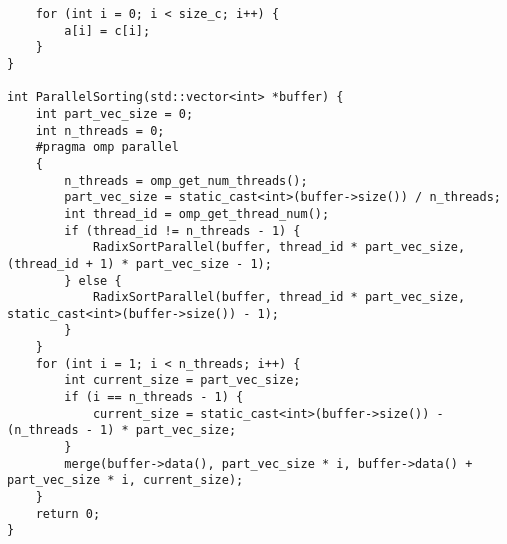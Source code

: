 \documentclass{report}
\begin{document}
\begin{lstlisting}
    for (int i = 0; i < size_c; i++) {
        a[i] = c[i];
    }
}

int ParallelSorting(std::vector<int> *buffer) {
    int part_vec_size = 0;
    int n_threads = 0;
    #pragma omp parallel
    {
        n_threads = omp_get_num_threads();
        part_vec_size = static_cast<int>(buffer->size()) / n_threads;
        int thread_id = omp_get_thread_num();
        if (thread_id != n_threads - 1) {
            RadixSortParallel(buffer, thread_id * part_vec_size, (thread_id + 1) * part_vec_size - 1);
        } else {
            RadixSortParallel(buffer, thread_id * part_vec_size, static_cast<int>(buffer->size()) - 1);
        }
    }
    for (int i = 1; i < n_threads; i++) {
        int current_size = part_vec_size;
        if (i == n_threads - 1) {
            current_size = static_cast<int>(buffer->size()) - (n_threads - 1) * part_vec_size;
        }
        merge(buffer->data(), part_vec_size * i, buffer->data() + part_vec_size * i, current_size);
    }
    return 0;
}
\end{lstlisting}
\end{document}
